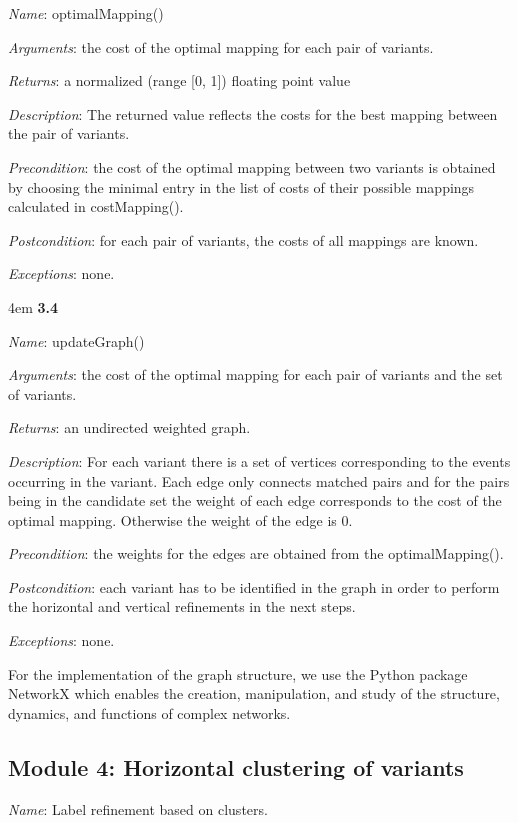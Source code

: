 \documentclass[notitlepage]{article}
\begin{document}
\begin{flushleft}
\textit{Name}: optimalMapping()

\textit{Arguments}: the cost of the optimal mapping for each pair of variants.

\textit{Returns}: a normalized (range [0, 1]) floating point value

\textit{Description}: The returned value reflects the costs for the best mapping between the pair of variants.

\textit{Precondition}: the cost of the optimal mapping between two variants is obtained by choosing the minimal entry in the list of costs of their possible mappings calculated in costMapping().

\textit{Postcondition}: for each pair of variants, the costs of all mappings are known.

\textit{Exceptions}: none.
\par
\endgroup


\medskip

\par
\begingroup
\leftskip4em
\textbf{3.4} 

\textit{Name}: updateGraph()

\textit{Arguments}: the cost of the optimal mapping for each pair of variants and the set of variants.

\textit{Returns}: an undirected weighted graph.

\textit{Description}: For each variant there is a set of vertices corresponding to the events occurring in the variant. Each edge only connects matched pairs and for the pairs being in the candidate set the weight of each edge corresponds to the cost of the optimal mapping. Otherwise the weight of the edge is 0.

\textit{Precondition}: the weights for the edges are obtained from the optimalMapping().

\textit{Postcondition}: each variant has to be identified in the graph in order to perform the horizontal and vertical refinements in the next steps.

\textit{Exceptions}: none.
\par
\endgroup

For the implementation of the graph structure, we use the Python package NetworkX which enables the creation, manipulation, and study of the structure, dynamics, and functions of complex networks.

\subsection{Module 4: Horizontal clustering of variants}
\textit{Name}: Label refinement based on clusters.


\end{flushleft}
\end{document}
